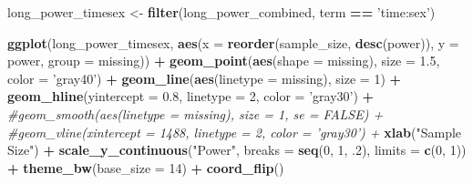 \documentclass[man,mask,floatsintext]{apa6}
\newenvironment{Shaded}{\begin{snugshade}}{\end{snugshade}}
\newcommand{\CommentTok}[1]{\textcolor[rgb]{0.56,0.35,0.01}{\textit{#1}}}
\newcommand{\DataTypeTok}[1]{\textcolor[rgb]{0.13,0.29,0.53}{#1}}
\newcommand{\DecValTok}[1]{\textcolor[rgb]{0.00,0.00,0.81}{#1}}
\newcommand{\FloatTok}[1]{\textcolor[rgb]{0.00,0.00,0.81}{#1}}
\newcommand{\KeywordTok}[1]{\textcolor[rgb]{0.13,0.29,0.53}{\textbf{#1}}}
\newcommand{\NormalTok}[1]{#1}
\newcommand{\OperatorTok}[1]{\textcolor[rgb]{0.81,0.36,0.00}{\textbf{#1}}}
\newcommand{\StringTok}[1]{\textcolor[rgb]{0.31,0.60,0.02}{#1}}
\begin{document}
\begin{Shaded}
\begin{Highlighting}[]
\NormalTok{long_power_timesex <-}\StringTok{ }\KeywordTok{filter}\NormalTok{(long_power_combined, term }\OperatorTok{==}\StringTok{ 'time:sex'}\NormalTok{)}

\KeywordTok{ggplot}\NormalTok{(long_power_timesex, }\KeywordTok{aes}\NormalTok{(}\DataTypeTok{x =} \KeywordTok{reorder}\NormalTok{(sample_size, }\KeywordTok{desc}\NormalTok{(power)), }\DataTypeTok{y =}\NormalTok{ power, }
                          \DataTypeTok{group =}\NormalTok{ missing)) }\OperatorTok{+}\StringTok{ }
\StringTok{  }\KeywordTok{geom_point}\NormalTok{(}\KeywordTok{aes}\NormalTok{(}\DataTypeTok{shape =}\NormalTok{ missing), }\DataTypeTok{size =} \FloatTok{1.5}\NormalTok{, }\DataTypeTok{color =} \StringTok{'gray40'}\NormalTok{) }\OperatorTok{+}\StringTok{ }
\StringTok{  }\KeywordTok{geom_line}\NormalTok{(}\KeywordTok{aes}\NormalTok{(}\DataTypeTok{linetype =}\NormalTok{ missing), }\DataTypeTok{size =} \DecValTok{1}\NormalTok{) }\OperatorTok{+}
\StringTok{  }\KeywordTok{geom_hline}\NormalTok{(}\DataTypeTok{yintercept =} \FloatTok{0.8}\NormalTok{, }\DataTypeTok{linetype =} \DecValTok{2}\NormalTok{, }\DataTypeTok{color =} \StringTok{'gray30'}\NormalTok{) }\OperatorTok{+}\StringTok{ }
\StringTok{  }\CommentTok{#geom_smooth(aes(linetype = missing), size = 1, se = FALSE) +}
\StringTok{  }\CommentTok{#geom_vline(xintercept = 1488, linetype = 2, color = 'gray30') +}
\StringTok{  }\KeywordTok{xlab}\NormalTok{(}\StringTok{"Sample Size"}\NormalTok{) }\OperatorTok{+}\StringTok{ }
\StringTok{  }\KeywordTok{scale_y_continuous}\NormalTok{(}\StringTok{"Power"}\NormalTok{, }\DataTypeTok{breaks =} \KeywordTok{seq}\NormalTok{(}\DecValTok{0}\NormalTok{, }\DecValTok{1}\NormalTok{, }\FloatTok{.2}\NormalTok{), }\DataTypeTok{limits =} \KeywordTok{c}\NormalTok{(}\DecValTok{0}\NormalTok{, }\DecValTok{1}\NormalTok{)) }\OperatorTok{+}
\StringTok{  }\KeywordTok{theme_bw}\NormalTok{(}\DataTypeTok{base_size =} \DecValTok{14}\NormalTok{) }\OperatorTok{+}\StringTok{ }
\StringTok{  }\KeywordTok{coord_flip}\NormalTok{()}
\end{Highlighting}
\end{Shaded}
\end{document}
